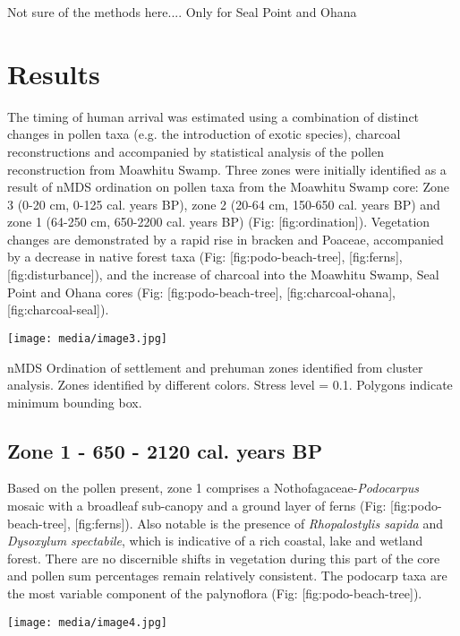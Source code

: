 \documentclass[]{article}
\begin{document}
Not sure of the methods here.... Only for Seal Point and Ohana

\section{Results}\label{results}

The timing of human arrival was estimated using a combination of distinct changes in pollen taxa (e.g. the introduction of exotic species), charcoal reconstructions and accompanied by statistical analysis of the pollen reconstruction from Moawhitu Swamp. Three zones were initially identified as a result of nMDS ordination on pollen taxa from the Moawhitu Swamp core: Zone 3 (0-20 cm, 0-125 cal. years BP), zone 2 (20-64 cm, 150-650 cal. years BP) and zone 1 (64-250 cm, 650-2200 cal. years BP) (Fig: {[}fig:ordination{]}). Vegetation changes are demonstrated by a rapid rise in bracken and Poaceae, accompanied by a decrease in native forest taxa (Fig: {[}fig:podo-beach-tree{]}, {[}fig:ferns{]}, {[}fig:disturbance{]}), and the increase of charcoal into the Moawhitu Swamp, Seal Point and Ohana cores (Fig: {[}fig:podo-beach-tree{]}, {[}fig:charcoal-ohana{]}, {[}fig:charcoal-seal{]}).

\texttt{[image: media/image3.jpg]}

nMDS Ordination of settlement and prehuman zones identified from cluster analysis. Zones identified by different colors. Stress level = 0.1. Polygons indicate minimum bounding box.

\subsection{Zone 1 - 650 - 2120 cal. years BP}\label{zone-1---650---2120-cal.-years-bp}

Based on the pollen present, zone 1 comprises a Nothofagaceae-\emph{Podocarpus} mosaic with a broadleaf sub-canopy and a ground layer of ferns (Fig: {[}fig:podo-beach-tree{]}, {[}fig:ferns{]}). Also notable is the presence of \emph{Rhopalostylis sapida} and \emph{Dysoxylum spectabile}, which is indicative of a rich coastal, lake and wetland forest. There are no discernible shifts in vegetation during this part of the core and pollen sum percentages remain relatively consistent. The podocarp taxa are the most variable component of the palynoflora (Fig: {[}fig:podo-beach-tree{]}).

\texttt{[image: media/image4.jpg]}
\end{document}

